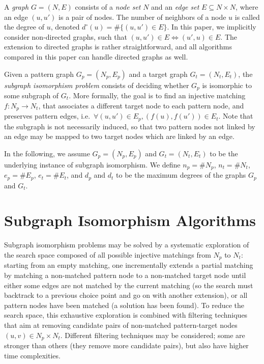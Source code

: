 \documentclass{llncs}
\begin{document}
A \emph{graph} $G=(N,E)$ consists of a \emph{node set} $N$ and an \emph{edge set} $E \subseteq N
\times N$, where an edge $(u,u')$ is a pair of nodes. The number of neighbors of a node $u$ is
called the degree of $u$, denoted $d^\circ(u)=\#\{ (u,u')\in E\}$. In this paper, we implicitly consider
non-directed graphs, such that $(u,u')\in E\Leftrightarrow (u',u)\in E$. The extension to directed
graphs is rather straightforward, and all algorithms compared in this paper can handle directed
graphs as well.

Given a pattern graph $G_p=(N_p,E_p)$ and a target graph $G_t=(N_t,E_t)$, the \emph{subgraph
isomorphism problem} consists of deciding whether $G_p$ is isomorphic to some subgraph of $G_t$.
More formally, the goal is to find an injective matching $f: N_p\rightarrow N_t$, that associates a
different target node to each pattern node, and preserves pattern edges, i.e.\ $\forall (u,u')
\in E_p, (f(u),f(u')) \in E_t$.
Note that the subgraph is not necessarily induced, so that two pattern nodes not linked by
an edge may be mapped to two target nodes which are linked by an edge.

In the following, we assume $G_p=(N_p,E_p)$ and $G_t=(N_t,E_t)$ to be the underlying instance of 
subgraph isomorphism.  We  define $n_p = \# N_p$, $n_t = \# N_t$,  $e_p=\# E_p$, $e_t=\#
E_t$, and $d_p$ and $d_t$ to be the maximum degrees of the graphs $G_p$ and $G_t$.

\section{Subgraph Isomorphism Algorithms}\label{sec:algs}

Subgraph isomorphism problems may be solved by a systematic exploration of the search space composed
of all possible injective matchings from $N_p$ to $N_t$: starting from an empty matching, one
incrementally extends a partial matching by matching a non-matched pattern node to a non-matched
target node until either some edges are not matched by the current matching (so the search must
backtrack to a previous choice point and go on with another extension), or all pattern nodes have
been matched (a solution has been found). To reduce the search space, this exhaustive exploration is
combined with filtering techniques that aim at removing candidate pairs of non-matched
pattern-target nodes $(u,v)\in N_p\times N_t$. Different filtering techniques may be considered;
some are stronger than others (they remove more candidate pairs), but also have higher time
complexities.
\end{document}
